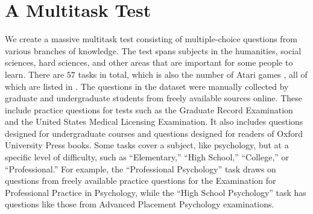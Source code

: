 \section{A Multitask Test}


We create a massive multitask test consisting of multiple-choice questions from various branches of knowledge.
The test spans subjects in the humanities, social sciences, hard sciences, and other areas that are important for some people to learn. 
There are $57$ tasks in total, 
which is also the number of Atari games \citep{Bellemare2013Atari}, 
all of which are listed in .
The questions in the dataset were manually collected by graduate and undergraduate students from freely available sources online. These include practice questions for tests such as the Graduate Record Examination and the United States Medical Licensing Examination. It also includes questions designed for undergraduate courses and questions designed for readers of Oxford University Press books. 
Some tasks cover a subject, like psychology, but at a specific level of difficulty, such as ``Elementary,'' ``High School,'' ``College,'' or ``Professional.''
For example, the ``Professional Psychology'' task draws on questions from freely available practice questions for the Examination for Professional Practice in Psychology, while the ``High School Psychology'' task has questions like those from Advanced Placement Psychology examinations.

